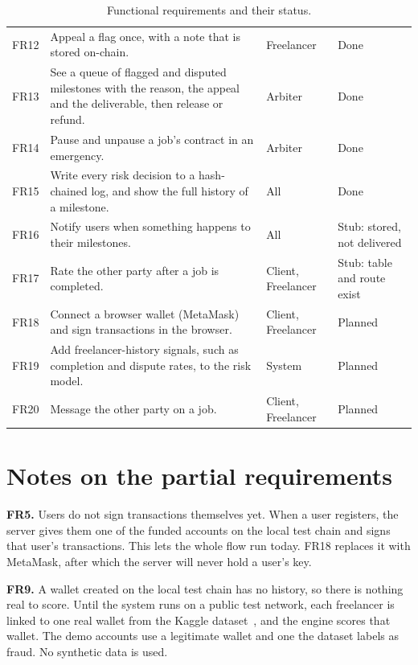 \begin{table}[htbp]
\begin{tabularx}{\textwidth}{>{\raggedright\arraybackslash}p{0.9cm}L>{\raggedright\arraybackslash}p{1.9cm}>{\raggedright\arraybackslash}p{2.6cm}}
FR12 & Appeal a flag once, with a note that is stored on-chain. & Freelancer & Done \\
FR13 & See a queue of flagged and disputed milestones with the reason, the appeal and the deliverable, then release or refund. & Arbiter & Done \\
FR14 & Pause and unpause a job's contract in an emergency. & Arbiter & Done \\
FR15 & Write every risk decision to a hash-chained log, and show the full history of a milestone. & All & Done \\
FR16 & Notify users when something happens to their milestones. & All & Stub: stored, not delivered \\
FR17 & Rate the other party after a job is completed. & Client, Freelancer & Stub: table and route exist \\
FR18 & Connect a browser wallet (MetaMask) and sign transactions in the browser. & Client, Freelancer & Planned \\
FR19 & Add freelancer-history signals, such as completion and dispute rates, to the risk model. & System & Planned \\
FR20 & Message the other party on a job. & Client, Freelancer & Planned \\ \hline
\end{tabularx}
\caption{Functional requirements and their status.}
\label{tab:fr}
\end{table}

\section{Notes on the partial requirements}
\textbf{FR5.} Users do not sign transactions themselves yet. When a user registers, the server gives them one of the funded accounts on the local test chain and signs that user's transactions. This lets the whole flow run today. FR18 replaces it with MetaMask, after which the server will never hold a user's key.

\textbf{FR9.} A wallet created on the local test chain has no history, so there is nothing real to score. Until the system runs on a public test network, each freelancer is linked to one real wallet from the Kaggle dataset~\cite{kaggle}, and the engine scores that wallet. The demo accounts use a legitimate wallet and one the dataset labels as fraud. No synthetic data is used.

